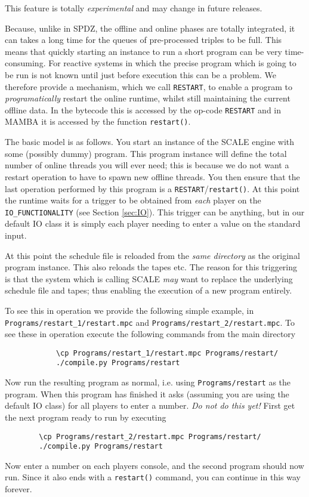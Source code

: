 \label{sec:restart}
This feature is totally {\em experimental} and may change in future
releases.

Because, unlike in SPDZ, the offline and online phases are totally
integrated, it can takes a long time for the queues of pre-processed
triples to be full. This means that quickly starting an instance to
run a short program can be very time-consuming. For reactive systems
in which the precise program which is going to be run is not known
until just before execution this can be a problem.
We therefore provide a mechanism, which we call \verb+RESTART+, to
enable a program to {\em programatically} restart the online runtime, whilst 
still maintaining the current offline data.
In the bytecode this is accessed by the op-code \verb+RESTART+
and in MAMBA it is accessed by the function \verb+restart()+.

The basic model is as follows.
You start an instance of the SCALE engine with some (possibly
dummy) program. This program instance will define the total number
of online threads you will ever need; this is because we do not
want a restart operation to have to spawn new offline threads.
You then ensure that the last operation performed by this
program is a \verb+RESTART+/\verb+restart()+.
At this point the runtime waits for a trigger to be obtained
from {\em each} player on the \verb+IO_FUNCTIONALITY+ (see
Section \ref{sec:IO}).
This trigger can be anything, but in our default IO class it
is simply each player needing to enter a value on the standard
input.

At this point the schedule file is reloaded from the 
{\em same directory} as the original program instance.
This also reloads the tapes etc.
The reason for this triggering is that the system which is
calling SCALE {\em may} want to replace the underlying
schedule file and tapes; thus enabling the execution of
a new program entirely.

To see this in operation we provide the following simple
example, in \verb+Programs/restart_1/restart.mpc+
and \verb+Programs/restart_2/restart.mpc+.
To see these in operation execute the following commands
from the main directory
\begin{verbatim}
            \cp Programs/restart_1/restart.mpc Programs/restart/
            ./compile.py Programs/restart
\end{verbatim}
Now run the resulting program as normal, i.e. using \verb+Programs/restart+
as the program.
When this program has finished it asks (assuming you are
using the default IO class) for all players to enter
a number. {\em Do not do this yet!}
First get the next program ready to run by executing
\begin{verbatim}
        \cp Programs/restart_2/restart.mpc Programs/restart/
        ./compile.py Programs/restart
\end{verbatim}
Now enter a number on each players console, and 
the second program should now run.
Since it also ends with a \verb+restart()+ command, you can
continue in this way forever.
